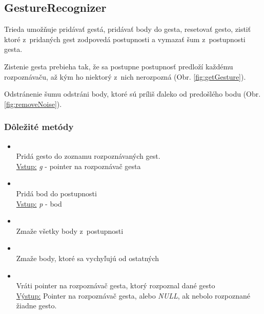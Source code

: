 \subsection{GestureRecognizer}

Trieda umožňuje pridávať gestá, pridávať body do gesta, resetovať gesto, zistiť ktoré z~pridaných gest zodpovedá postupnosti a vymazať šum z~postupnosti gesta.

Zistenie gesta prebieha tak, že sa postupne postupnosť predloží každému rozpoznávaču, až kým ho niektorý z~nich nerozpozná (Obr. \ref{fig:getGesture}).

Odstránenie šumu odstráni body, ktoré sú príliš ďaleko od predošlého bodu (Obr. \ref{fig:removeNoise}). 

\subsubsection{Dôležité metódy}
\begin{itemize}
\item {}
\\Pridá gesto do zoznamu rozpoznávaných gest.
\\ \underline{Vstup:} \textit{g} - pointer na rozpoznávač gesta
\item {}
\\Pridá bod do postupnosti
\\ \underline{Vstup:} \textit{p} - bod
\item {}
\\Zmaže všetky body z~postupnosti
\item {}
\\Zmaže body, ktoré sa vychyľujú od ostatných
\item {}
\\Vráti pointer na rozpoznávač gesta, ktorý rozpoznal dané gesto
\\ \underline{Výstup:} Pointer na rozpoznávač gesta, alebo \textit{NULL}, ak nebolo rozpoznané žiadne gesto.
\end{itemize}

